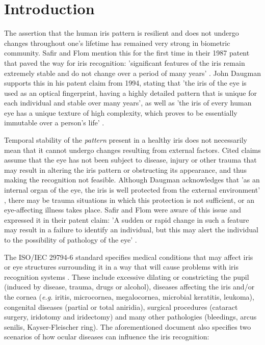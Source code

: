\documentclass[a4paper]{spie}
\begin{document}
\section{Introduction}
The assertion that the human iris pattern is resilient and does not undergo changes throughout one's lifetime has remained very strong in biometric community. Safir and Flom mention this for the first time in their 1987 patent that paved the way for iris recognition: 'significant features of the iris remain extremely stable and do not change over a period of many years' \cite{SafirFlom}. John Daugman supports this in his patent claim from 1994, stating that 'the iris of the eye is used as an optical fingerprint, having a highly detailed pattern that is unique for each individual and stable over many years', as well as 'the iris of every human eye has a unique texture of high complexity, which proves to be essentially immutable over a person's life' \cite{DaugmanPatent}. 

Temporal stability of the \emph{pattern} present in a healthy iris does not necessarily mean that it cannot undergo changes resulting from external factors. Cited claims assume that the eye has not been subject to disease, injury or other trauma that may result in altering the iris pattern or obstructing its appearance, and thus making the recognition not feasible. Although Daugman acknowledges that 'as an internal organ of the eye, the iris is well protected from the external environment' \cite{DaugmanPatent}, there may be trauma situations in which this protection is not sufficient, or an eye-affecting illness takes place. Safir and Flom were aware of this issue and expressed it in their patent claim: 'A sudden or rapid change in such a feature may result in a failure to identify an individual, but this may alert the individual to the possibility of pathology of the eye' \cite{SafirFlom}.

The ISO/IEC 29794-6 standard specifies medical conditions that may affect iris or eye structures surrounding it in a way that will cause problems with iris recognition systems \cite{ISO}. These include excessive dilating or constricting the pupil (induced by disease, trauma, drugs or alcohol), diseases affecting the iris and/or the cornea (\emph{e.g.} iritis, microcornea, megalocornea, microbial keratitis, leukoma), congenital diseases (partial or total aniridia), surgical procedures (cataract surgery, iridotomy and iridectomy) and many other pathologies (bleedings, arcus senilis, Kayser-Fleischer ring). The aforementioned document also specifies two scenarios of how ocular diseases can influence the iris recognition:
\end{document}

